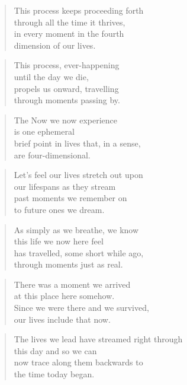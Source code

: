 \documentclass[10pt,a4paper]{article}
\begin{document}
\begin{multicols}{2}
\begin{verse}
This process keeps proceeding forth\\
through all the time it thrives,\\
in every moment in the fourth\\
dimension of our lives.
\end{verse}

\begin{verse}
This process, ever-happening\\
until the day we die,\\
propels us onward, travelling\\
through moments passing by.
\end{verse}

\begin{verse}
The Now we now experience\\
is one ephemeral\\
brief point in lives that, in a sense,\\
are four-dimensional.
\end{verse}

\begin{verse}
Let’s feel our lives stretch out upon\\
our lifespans as they stream\\
past moments we remember on\\
to future ones we dream.
\end{verse}

\begin{verse}
As simply as we breathe, we know\\
this life we now here feel\\
has travelled, some short while ago,\\
through moments just as real.
\end{verse}

\begin{verse}
There was a moment we arrived\\
at this place here somehow.\\
Since we were there and we survived,\\
our lives include that now.
\end{verse}

\begin{verse}
The lives we lead have streamed right through\\
this day and so we can\\
now trace along them backwards to\\
the time today began.
\end{verse}


\end{multicols}
\end{document}
